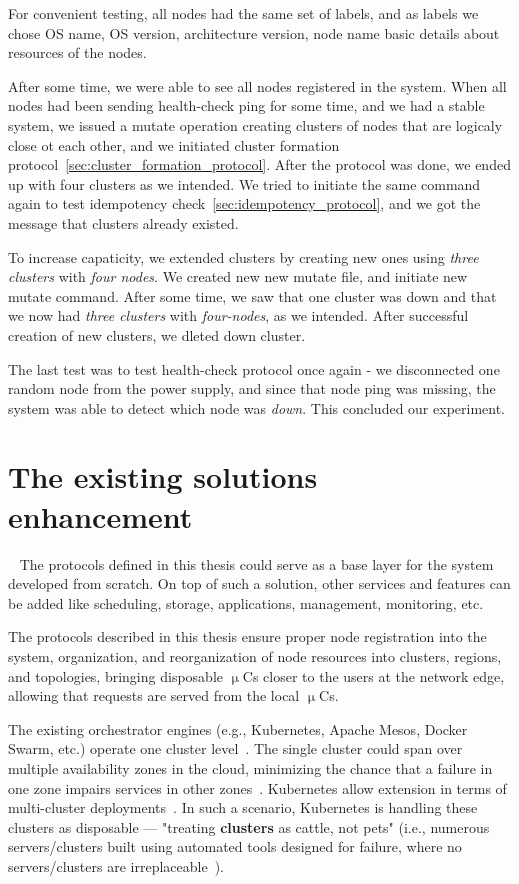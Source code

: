 For convenient testing, all nodes had the same set of labels, and as labels we chose OS name, OS version, architecture version, node name basic details about resources of the nodes.

After some time, we were able to see all nodes registered in the system. When all nodes had been sending health-check ping for some time, and we had a stable system, we issued a mutate operation creating clusters of nodes that are logicaly close ot each other, and we initiated cluster formation protocol~\ref{sec:cluster_formation_protocol}. After the protocol was done, we ended up with four clusters as we intended. We tried to initiate the same command again to test idempotency check~\ref{sec:idempotency_protocol}, and we got the message that clusters already existed.

To increase capaticity, we extended clusters by creating new ones using \emph{three clusters} with \emph{four nodes}. We created new new mutate file, and initiate new mutate command. After some time, we saw that one cluster was down and that we now had \emph{three clusters} with \emph{four-nodes}, as we intended. After successful creation of new clusters, we dleted down cluster.

The last test was to test health-check protocol once again - we disconnected one random node from the power supply, and since that node ping was missing, the system was able to detect which node was \emph{down}. This concluded our experiment.
%
\section{The existing solutions enhancement}~\label{enhancement_of_the_existing_solutions}
%
The protocols defined in this thesis could serve as a base layer for the system developed from scratch. On top of such a solution, other services and features can be added like scheduling, storage, applications, management, monitoring, etc. 

The protocols described in this thesis ensure proper node registration into the system, organization, and reorganization of node resources into clusters, regions, and topologies, bringing disposable $\upmu$Cs closer to the users at the network edge, allowing that requests are served from the local $\upmu$Cs.

The existing orchestrator engines (e.g., Kubernetes, Apache Mesos, Docker Swarm, etc.) operate one cluster level~\cite{BurnsGOBW16, VermaPKOTW15, RossiCPN20, KubeEdge, KubeMulti}. The single cluster could span over multiple availability zones in the cloud, minimizing the chance that a failure in one zone impairs services in other zones~\cite{KubeMulti}. Kubernetes allow extension in terms of multi-cluster deployments~{\cite{KubeMulti}}. In such a scenario, Kubernetes is handling these clusters as disposable --- "treating \textbf{clusters} as cattle, not pets" (i.e., numerous servers/clusters built using automated tools designed for failure, where no servers/clusters are irreplaceable~\cite{CERN}).

